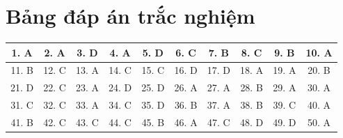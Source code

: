 \documentclass[12pt,a4paper]{article}
\begin{document}
\clearpage\section*{Bảng đáp án trắc nghiệm}
\begin{center}\begin{tabular}{|c|c|c|c|c|c|c|c|c|c|}
\hline
1. A & 2. A & 3. D & 4. A & 5. D & 6. C & 7. B & 8. C & 9. B & 10. A\\\hline
11. B & 12. C & 13. A & 14. C & 15. C & 16. D & 17. D & 18. A & 19. A & 20. B\\\hline
21. D & 22. C & 23. A & 24. D & 25. D & 26. A & 27. A & 28. B & 29. A & 30. A\\\hline
31. C & 32. C & 33. A & 34. C & 35. D & 36. B & 37. A & 38. B & 39. C & 40. A\\\hline
41. B & 42. C & 43. C & 44. C & 45. B & 46. A & 47. C & 48. D & 49. D & 50. A\\\hline
\end{tabular}\end{center}
\end{document}
